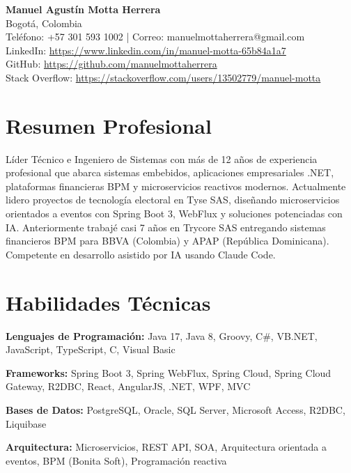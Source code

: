 \documentclass[11pt,a4paper]{article}
\begin{document}
\begin{center}
    {\LARGE\bfseries Manuel Agust\'{i}n Motta Herrera} \\[6pt]
    Bogot\'{a}, Colombia \\
    Tel\'{e}fono: +57 301 593 1002 \quad | \quad Correo: manuelmottaherrera@gmail.com \\
    LinkedIn: \url{https://www.linkedin.com/in/manuel-motta-65b84a1a7} \\
    GitHub: \url{https://github.com/manuelmottaherrera} \\
    Stack Overflow: \url{https://stackoverflow.com/users/13502779/manuel-motta}
\end{center}

\section{Resumen Profesional}

L\'{i}der T\'{e}cnico e Ingeniero de Sistemas con m\'{a}s de 12 a\~{n}os de experiencia profesional que abarca sistemas embebidos, aplicaciones empresariales .NET, plataformas financieras BPM y microservicios reactivos modernos. Actualmente lidero proyectos de tecnolog\'{i}a electoral en Tyse SAS, dise\~{n}ando microservicios orientados a eventos con Spring Boot 3, WebFlux y soluciones potenciadas con IA. Anteriormente trabaj\'{e} casi 7 a\~{n}os en Trycore SAS entregando sistemas financieros BPM para BBVA (Colombia) y APAP (Rep\'{u}blica Dominicana). Competente en desarrollo asistido por IA usando Claude Code.

\section{Habilidades T\'{e}cnicas}

\textbf{Lenguajes de Programaci\'{o}n:} Java 17, Java 8, Groovy, C\#, VB.NET, JavaScript, TypeScript, C, Visual Basic

\textbf{Frameworks:} Spring Boot 3, Spring WebFlux, Spring Cloud, Spring Cloud Gateway, R2DBC, React, AngularJS, .NET, WPF, MVC

\textbf{Bases de Datos:} PostgreSQL, Oracle, SQL Server, Microsoft Access, R2DBC, Liquibase

\textbf{Arquitectura:} Microservicios, REST API, SOA, Arquitectura orientada a eventos, BPM (Bonita Soft), Programaci\'{o}n reactiva
\end{document}
